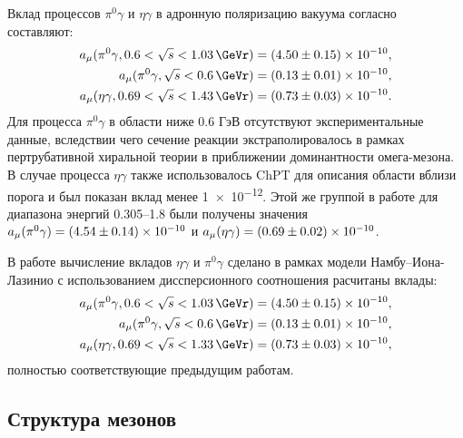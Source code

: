 Вклад процессов $\pi^0\gamma$ и $\eta\gamma$ в адронную поляризацию вакуума согласно \cite{Hagiwara:2003da} составляют:
\begin{align}
    a_\mu ( \pi^0 \gamma, 0.6 < \sqrt{s} < \SI{1.03}{\GeVr} ) =
    \num{4.50+-0.15e-10} , \\
    a_\mu ( \pi^0 \gamma, \sqrt{s} < \SI{0.6}{\GeVr} ) =
    \num{0.13+-0.01e-10} , \\
    a_\mu ( \eta \gamma, 0.69 < \sqrt{s} < \SI{1.43}{\GeVr} ) =
    \num{0.73+-0.03e-10} .
\end{align}
Для процесса $\pi^0 \gamma$ в области ниже 0.6 ГэВ отсутствуют экспериментальные данные, вследствии чего сечение реакции экстраполировалось в рамках пертрубативной хиральной теории в приближении доминантности омега-мезона.
В случае процесса $\eta \gamma$ также использовалось ChPT для описания области вблизи порога и был показан вклад менее \num{1e-12}.
Этой же группой в работе \cite{Hagiwara:2011af} для диапазона энергий \SIrange{0.305}{1.8}{\GeVr} были получены значения $a_\mu(\pi^0\gamma) = \num{4.54+-.14e-10}$ и $a_\mu(\eta\gamma) = \num{0.69+-.02e-10}$.

В работе \cite{Ahmadov:2010hq} вычисление вкладов $\eta \gamma$ и $\pi^0 \gamma$ сделано в рамках модели Намбу--Иона-Лазинио с использованием диссперсионного соотношения расчитаны вклады:
\begin{align}
    a_\mu ( \pi^0 \gamma, 0.6 < \sqrt{s} < \SI{1.03}{\GeVr} ) =
    \num{4.5+-0.15e-10} , \\
    a_\mu ( \pi^0 \gamma, \sqrt{s} < \SI{0.6}{\GeVr} ) =
    \num{0.13+-0.01e-10} , \\
    a_\mu ( \eta \gamma, 0.69 < \sqrt{s} < \SI{1.33}{\GeVr} ) =
    \num{0.73+-0.03e-10} ,
\end{align}
полностью соответствующие предыдущим работам.


\subsection{Структура мезонов}
\label{meson-structures}

